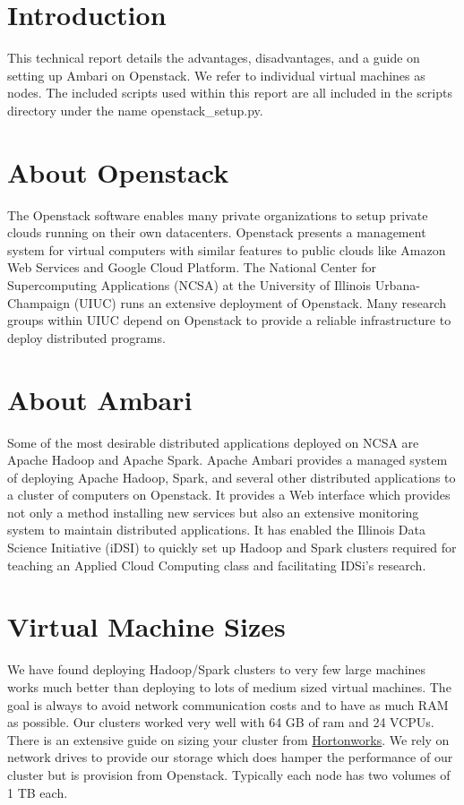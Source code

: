 \documentclass[9pt,twocolumn,twoside]{idsi}
\begin{document}
\makecoverpage

\maketitle

\section{Introduction}
This technical report details the advantages, disadvantages, and a guide on setting up Ambari on Openstack. We refer to individual virtual machines as nodes. The included scripts used within this report are all included in the scripts directory under the name openstack\_setup.py. 

\section{About Openstack}
The Openstack software enables many private organizations to setup private clouds running on their own datacenters. Openstack presents a management system for virtual computers with similar features to public clouds like Amazon Web Services and Google Cloud Platform. The National Center for Supercomputing Applications (NCSA) at the University of Illinois Urbana-Champaign (UIUC) runs an extensive deployment of Openstack. Many research groups within UIUC depend on Openstack to provide a reliable infrastructure to deploy distributed programs.

\section{About Ambari}
Some of the most desirable distributed applications deployed on NCSA are Apache Hadoop and Apache Spark. Apache Ambari provides a managed system of deploying Apache Hadoop, Spark, and several other distributed applications to a cluster of computers on Openstack. It provides a Web interface which provides not only a method installing new services but also an extensive monitoring system to maintain distributed applications. It has enabled the Illinois Data Science Initiative (iDSI) to quickly set up Hadoop and Spark clusters required for teaching an Applied Cloud Computing class and facilitating IDSi's research.

\section{Virtual Machine Sizes}
We have found deploying Hadoop/Spark clusters to very few large machines works much better than deploying to lots of medium sized virtual machines. The goal is always to avoid network communication costs and to have as much RAM as possible. Our clusters worked very well with 64 GB of ram and 24 VCPUs. There is an extensive guide on sizing your cluster from \href{https://docs.hortonworks.com/HDPDocuments/HDP2/HDP-2.3.0/bk_cluster-planning-guide/bk_cluster-planning-guide-20150721.pdf}{Hortonworks}. We rely on network drives to provide our storage which does hamper the performance of our cluster but is provision from Openstack. Typically each node has two volumes of 1 TB each.
\end{document}
